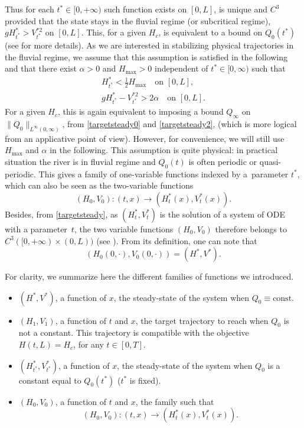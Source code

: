 Thus for each $t^{*}\in[0,+\infty)$ such function exists on $[0,L]$, is unique and $C^{3}$ provided that the state stays in the fluvial regime (or subcritical regime), \ie $g H_{t^{*}}^{*}>V^{*2}_{t^{*}}$ on $[0,L]$.
This, for a given $H_{c}$, is equivalent to a bound on $Q_{0}(t^{*})$
(see \cite{HS} for more details).
As we are interested in {stabilizing} physical trajectories in the fluvial regime, we assume that this assumption is satisfied {in the following} and that
there exist $\alpha>0$ and $H_{\max}>0$ independent of $t^{*}\in[0,\infty)$ such that
\begin{equation}
\begin{split}
H_{t^{*}}^{*}<\frac{1}{2}H_{\max}\quad\text{on }[0,L],\\
gH_{t^{*}}^{*}-V_{{t^{*}}}^{*2}>2\alpha\quad\text{on }[0,L].
\end{split}
\label{fluvial0}
\end{equation}
For a given $H_{c}$, this is again equivalent to imposing a bound $Q_{\infty}$ on $\lVert Q_{0}\rVert_{L^{\infty}(0,\infty)}$, from \eqref{targetsteady0} and \eqref{targetsteady2},
(which is more logical {from an applicative point of view}).
However, for convenience, we will still use $H_{\max}$ and $\alpha$ in the following. This assumption is quite physical: in practical situation the river is in fluvial regime and $Q_{0}(t)$ is often periodic or quasi-periodic.
This gives a family of one-variable functions indexed by a~parameter $t^{*}$, which can also be seen as the two-variable functions
\begin{equation*}
(H_{0},V_{0}) : (t,x)\to (H^{*}_{t}(x),V^{*}_{t}(x)).
\end{equation*}
Besides, from \eqref{targetsteady}, as $(H_{t}^{*},V_{t}^{*})$
is the solution of a system of ODE with a parameter~$t$, the two variable functions $(H_{0},V_{0})$ therefore belongs to $C^{3}([0,+\infty)\times(0,L))$ (see \cite[Chap.\,5, Cor.\,4.1]{Hartman}).
{From} its definition, one can note that
\[
(H_{0}(0,\cdot),V_{0}(0,\cdot))=(H^{*},V^{*}).
\]

For clarity, we summarize here the different families of functions we introduced.
\begin{itemize}
\item
$(H^{*},V^{*})$, a function of $x$, the steady-state of the system when $Q_{0}\equiv \text{const.}$
\item
$(H_{1},V_{1})$, a function of $t$ and $x$, the target trajectory to reach when $Q_{0}$ is not a
constant. This trajectory is compatible with the objective $H(t,L) = H_{c}$, for any $t\in [0,T]$.
\item
$(H^{*}_{t^{*}},V^{*}_{t^{*}})$, a function of $x$, the steady-state of the system when $Q_{0}$ is a constant equal to $Q_{0}({t^{*}})$ ($t^{*}$ is fixed).
\item
$(H_{0},V_{0})$, a function of $t$ and $x$, the family such that
\[
(H_{0}, V_{0}):(t,x) \to (H_{t}^{*}(x),V^{*}_{t}(x)).
\]
\end{itemize}

